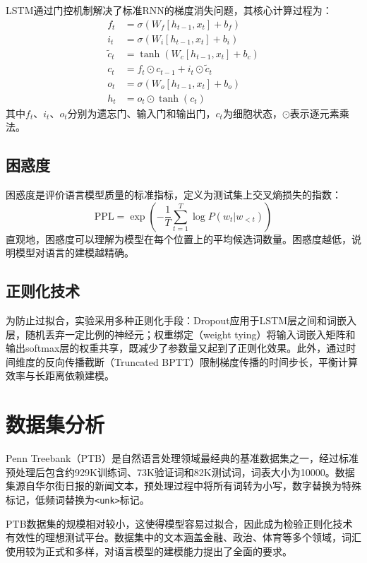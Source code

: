 \documentclass[12pt,a4paper]{article}
\begin{document}
LSTM通过门控机制解决了标准RNN的梯度消失问题，其核心计算过程为：
\begin{align}
f_t &= \sigma(W_f[h_{t-1}, x_t] + b_f) \\
i_t &= \sigma(W_i[h_{t-1}, x_t] + b_i) \\
\tilde{c}_t &= \tanh(W_c[h_{t-1}, x_t] + b_c) \\
c_t &= f_t \odot c_{t-1} + i_t \odot \tilde{c}_t \\
o_t &= \sigma(W_o[h_{t-1}, x_t] + b_o) \\
h_t &= o_t \odot \tanh(c_t)
\end{align}
其中$f_t$、$i_t$、$o_t$分别为遗忘门、输入门和输出门，$c_t$为细胞状态，$\odot$表示逐元素乘法。

\subsection{困惑度}

困惑度是评价语言模型质量的标准指标，定义为测试集上交叉熵损失的指数：
\begin{equation}
\text{PPL} = \exp\left(-\frac{1}{T}\sum_{t=1}^{T}\log P(w_t | w_{<t})\right)
\end{equation}
直观地，困惑度可以理解为模型在每个位置上的平均候选词数量。困惑度越低，说明模型对语言的建模越精确。

\subsection{正则化技术}

为防止过拟合，实验采用多种正则化手段：Dropout应用于LSTM层之间和词嵌入层，随机丢弃一定比例的神经元；权重绑定（weight tying）将输入词嵌入矩阵和输出softmax层的权重共享，既减少了参数量又起到了正则化效果。此外，通过时间维度的反向传播截断（Truncated BPTT）限制梯度传播的时间步长，平衡计算效率与长距离依赖建模。

\section{数据集分析}

Penn Treebank（PTB）是自然语言处理领域最经典的基准数据集之一，经过标准预处理后包含约929K训练词、73K验证词和82K测试词，词表大小为10000。数据集源自华尔街日报的新闻文本，预处理过程中将所有词转为小写，数字替换为特殊标记，低频词替换为\texttt{<unk>}标记。

PTB数据集的规模相对较小，这使得模型容易过拟合，因此成为检验正则化技术有效性的理想测试平台。数据集中的文本涵盖金融、政治、体育等多个领域，词汇使用较为正式和多样，对语言模型的建模能力提出了全面的要求。
\end{document}
